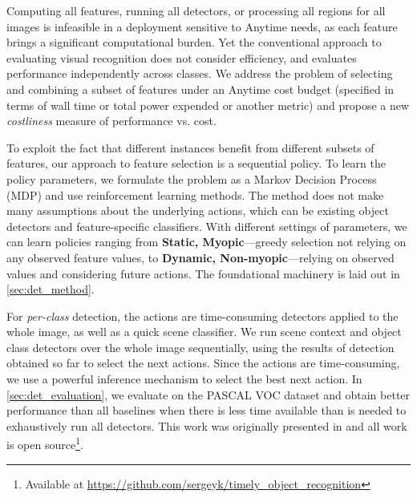 Computing all features, running all detectors, or processing all regions for all images is infeasible in a deployment sensitive to Anytime needs, as each feature brings a significant computational burden.
Yet the conventional approach to evaluating visual recognition does not consider efficiency, and evaluates performance independently across classes.
We address the problem of selecting and combining a subset of features under an Anytime cost budget (specified in terms of wall time or total power expended or another metric) and propose a new \emph{costliness} measure of performance vs. cost.

To exploit the fact that different instances benefit from different subsets of features, our approach to feature selection is a sequential policy.
To learn the policy parameters, we formulate the problem as a Markov Decision Process (MDP) and use reinforcement learning methods.
The method does not make many assumptions about the underlying actions, which can be existing object detectors and feature-specific classifiers.
With different settings of parameters, we can learn policies ranging from \textbf{Static, Myopic}---greedy selection not relying on any observed feature values, to \textbf{Dynamic, Non-myopic}---relying on observed values and considering future actions.
The foundational machinery is laid out in \autoref{sec:det_method}.

For \emph{per-class} detection, the actions are time-consuming detectors applied to the whole image, as well as a quick scene classifier.
We run scene context and object class detectors over the whole image sequentially, using the results of detection obtained so far to select the next actions.
Since the actions are time-consuming, we use a powerful inference mechanism to select the best next action.
In \autoref{sec:det_evaluation}, we evaluate on the PASCAL VOC dataset and obtain better performance than all baselines when there is less time available than is needed to exhaustively run all detectors.
This work was originally presented in \cite{Karayev-NIPS-2012} and all work is open source\footnote{Available at \url{https://github.com/sergeyk/timely_object_recognition}}.

